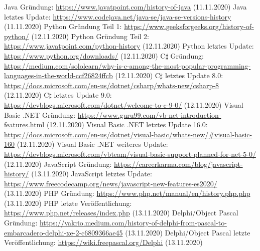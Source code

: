 \documentclass[ngerman]{article}
\begin{document}
\begin{thebibliography}{9}
        Java Gründung: \url{https://www.javatpoint.com/history-of-java} (11.11.2020)
        Java letztes Update: \url{https://www.codejava.net/java-se/java-se-versions-history} (11.11.2020)
        Python Gründung Teil 1: \url{https://www.geeksforgeeks.org/history-of-python/} (12.11.2020)
        Python Gründung Teil 2: \url{https://www.javatpoint.com/python-history} (12.11.2020)
        Python letztes Update: \url{https://www.python.org/downloads/} (12.11.2020)
        C$\sharp$ Gründung: \url{https://medium.com/sololearn/why-is-c-among-the-most-popular-programming-languages-in-the-world-ccf26824ffcb} (12.11.2020)
        C$\sharp$ letztes Update 8.0: \url{https://docs.microsoft.com/en-us/dotnet/csharp/whats-new/csharp-8} (12.11.2020)
        C$\sharp$ letztes Update 9.0: \url{https://devblogs.microsoft.com/dotnet/welcome-to-c-9-0/} (12.11.2020)
        Visual Basic .NET Gründung: \url{https://www.guru99.com/vb-net-introduction-features.html} (12.11.2020)
        Visual Basic .NET letztes Update 16.0: \url{https://docs.microsoft.com/en-us/dotnet/visual-basic/whats-new/#visual-basic-160} (12.11.2020)
        Visual Basic .NET weiteres Update: \url{https://devblogs.microsoft.com/vbteam/visual-basic-support-planned-for-net-5-0/} (12.11.2020)
        JavaScript Gründung: \url{https://careerkarma.com/blog/javascript-history/} (13.11.2020)
        JavaScript letztes Update: \url{https://www.freecodecamp.org/news/javascript-new-features-es2020/} (13.11.2020)
        PHP Gründung: \url{https://www.php.net/manual/en/history.php.php} (13.11.2020)
        PHP letzte Veröffentlichung: \url{https://www.php.net/releases/index.php} (13.11.2020)
        Delphi/Object Pascal Gründung: \url{https://vakrio.medium.com/history-of-delphi-from-pascal-to-embarcadero-delphi-xe-2-c6809366ae45} (13.11.2020)
        Delphi/Object Pascal letzte Veröffentlichung: \url{https://wiki.freepascal.org/Delphi} (13.11.2020)

\end{thebibliography}
\end{document}
